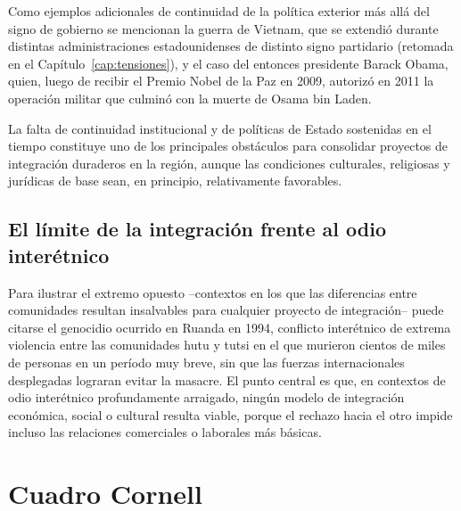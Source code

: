 \documentclass[12pt,oneside]{book}
\begin{document}
Como ejemplos adicionales de continuidad de la política exterior más allá del signo de gobierno se mencionan la guerra de Vietnam, que se extendió durante distintas administraciones estadounidenses de distinto signo partidario (retomada en el Capítulo~\ref{cap:tensiones}), y el caso del entonces presidente Barack Obama, quien, luego de recibir el Premio Nobel de la Paz en 2009, autorizó en 2011 la operación militar que culminó con la muerte de Osama bin Laden.

\begin{importante}
La falta de continuidad institucional y de políticas de Estado sostenidas en el tiempo constituye uno de los principales obstáculos para consolidar proyectos de integración duraderos en la región, aunque las condiciones culturales, religiosas y jurídicas de base sean, en principio, relativamente favorables.
\end{importante}

\subsection{El límite de la integración frente al odio interétnico}

Para ilustrar el extremo opuesto --contextos en los que las diferencias entre comunidades resultan insalvables para cualquier proyecto de integración-- puede citarse el genocidio ocurrido en Ruanda en 1994, conflicto interétnico de extrema violencia entre las comunidades hutu y tutsi en el que murieron cientos de miles de personas en un período muy breve, sin que las fuerzas internacionales desplegadas lograran evitar la masacre. El punto central es que, en contextos de odio interétnico profundamente arraigado, ningún modelo de integración económica, social o cultural resulta viable, porque el rechazo hacia el otro impide incluso las relaciones comerciales o laborales más básicas.

\section{Cuadro Cornell}
\end{document}
